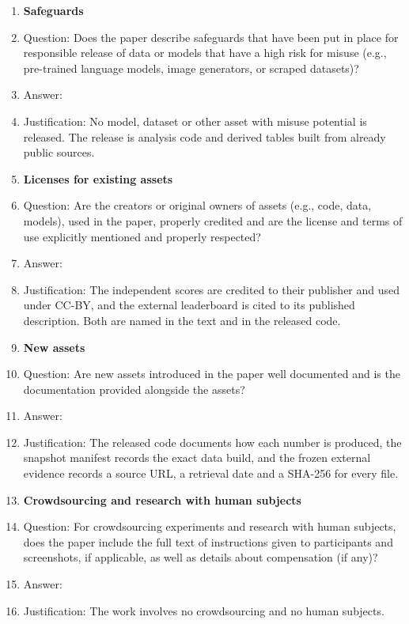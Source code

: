 \begin{enumerate}
\item {\bf Safeguards}
    \item[] Question: Does the paper describe safeguards that have been put in place for responsible release of data or models that have a high risk for misuse (e.g., pre-trained language models, image generators, or scraped datasets)?
    \item[] Answer: \answerNA{}
    \item[] Justification: No model, dataset or other asset with misuse potential is released. The release is analysis code and derived tables built from already public sources.


\item {\bf Licenses for existing assets}
    \item[] Question: Are the creators or original owners of assets (e.g., code, data, models), used in the paper, properly credited and are the license and terms of use explicitly mentioned and properly respected?
    \item[] Answer: \answerYes{}
    \item[] Justification: The independent scores are credited to their publisher and used under CC-BY, and the external leaderboard is cited to its published description. Both are named in the text and in the released code.


\item {\bf New assets}
    \item[] Question: Are new assets introduced in the paper well documented and is the documentation provided alongside the assets?
    \item[] Answer: \answerYes{}
    \item[] Justification: The released code documents how each number is produced, the snapshot manifest records the exact data build, and the frozen external evidence records a source URL, a retrieval date and a SHA-256 for every file.


\item {\bf Crowdsourcing and research with human subjects}
    \item[] Question: For crowdsourcing experiments and research with human subjects, does the paper include the full text of instructions given to participants and screenshots, if applicable, as well as details about compensation (if any)?
    \item[] Answer: \answerNA{}
    \item[] Justification: The work involves no crowdsourcing and no human subjects.



\end{enumerate}
